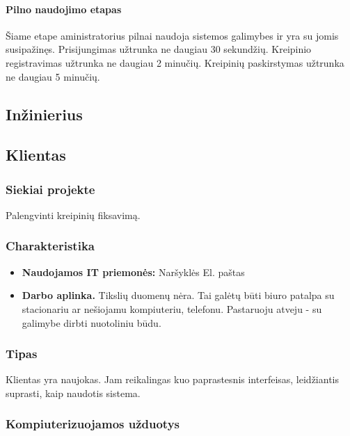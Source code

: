 			\setcounter{tocdepth}{5} \setcounter{secnumdepth}{5}
			
			\paragraph{Pilno naudojimo etapas}
			
			Šiame etape aministratorius pilnai naudoja sistemos galimybes ir yra su jomis susipažinęs.
			Prisijungimas užtrunka ne daugiau 30 sekundžių. Kreipinio registravimas užtrunka ne daugiau 2 minučių.
			Kreipinių paskirstymas užtrunka ne daugiau 5 minučių.
			
	\subsection{Inžinierius}
	
	\subsection{Klientas}
			
		\subsubsection{Siekiai projekte}
		
		Palengvinti kreipinių fiksavimą.
		
		\subsubsection{Charakteristika}
		
		\begin{itemize}
			\item \textbf{Naudojamos IT priemonės:}
				\subitem Naršyklės
				\subitem El. paštas
			\item \textbf{Darbo aplinka.} Tikslių duomenų nėra. 
			Tai galėtų būti biuro patalpa su stacionariu ar nešiojamu kompiuteriu, telefonu.
			Pastaruoju atveju - su galimybe dirbti nuotoliniu būdu.
		\end{itemize}
			
		\subsubsection{Tipas}
		
		Klientas yra naujokas. Jam reikalingas kuo paprastesnis interfeisas, leidžiantis suprasti, kaip naudotis sistema.
		
		\subsubsection{Kompiuterizuojamos užduotys}
		
